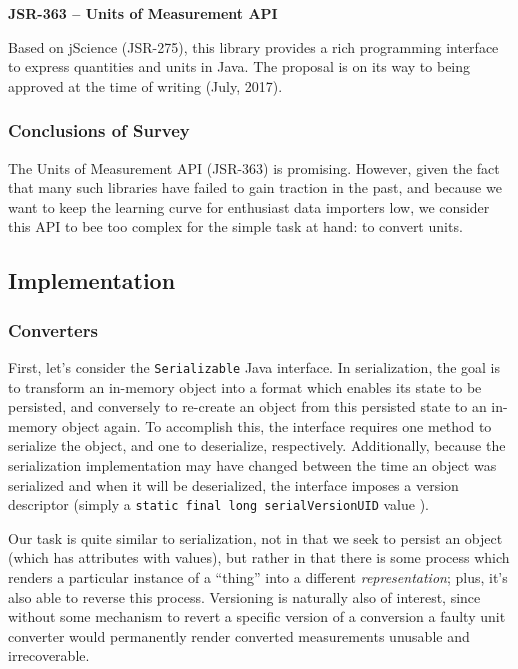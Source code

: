 \textbf{JSR-363 -- Units of Measurement API}

Based on jScience (JSR-275), this library provides a rich programming
interface to express quantities and units in Java. The proposal is on
its way to being approved at the time of writing (July, 2017).

\subsubsection{Conclusions of Survey}\label{conclusions-of-survey}

The Units of Measurement API (JSR-363) is promising. However, given the
fact that many such libraries have failed to gain traction in the past,
and because we want to keep the learning curve for enthusiast data
importers low, we consider this API to bee too complex for the simple
task at hand: to convert units.

\subsection{Implementation}\label{implementation}

\subsubsection{Converters}\label{converters}

First, let's consider the \texttt{Serializable} Java interface. In
serialization, the goal is to transform an in-memory object into a
format which enables its state to be persisted, and conversely to
re-create an object from this persisted state to an in-memory object
again. To accomplish this, the interface requires one method to
serialize the object, and one to deserialize, respectively.
Additionally, because the serialization implementation may have changed
between the time an object was serialized and when it will be
deserialized, the interface imposes a version descriptor (simply a
\texttt{static\ final\ long\ serialVersionUID} value ).

Our task is quite similar to serialization, not in that we seek to
persist an object (which has attributes with values), but rather in that
there is some process which renders a particular instance of a ``thing''
into a different \emph{representation}; plus, it's also able to reverse
this process. Versioning is naturally also of interest, since without
some mechanism to revert a specific version of a conversion a faulty
unit converter would permanently render converted measurements unusable
and irrecoverable.

